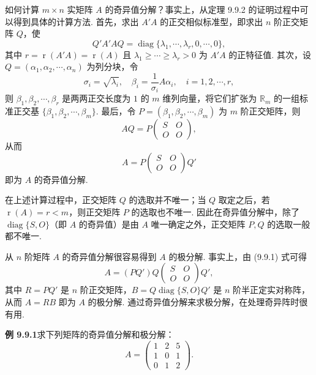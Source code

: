 \documentclass[UTF8, 12pt, fontset=fandol, oneside]{ctexart}
\begin{document}
如何计算 $m\times n$ 实矩阵 $A$ 的奇异值分解？事实上，从定理 9.9.2 的证明过程中可以得到具体的计算方法. 首先，求出 $A'A$ 的正交相似标准型，即求出 $n$ 阶正交矩阵 $Q$，使
\[
  Q'A'AQ=\operatorname{diag}\{\lambda_1,\cdots,\lambda_r,0,\cdots,0\},
\]
其中 $r=\operatorname{r}(A'A)=\operatorname{r}(A)$ 且 $\lambda_1\ge\cdots\ge\lambda_r>0$ 为 $A'A$ 的正特征值. 其次，设 $Q=(\alpha_1,\alpha_2,\cdots,\alpha_n)$ 为列分块，令
\[
  \sigma_i=\sqrt{\lambda_i},\quad \beta_i=\frac1{\sigma_i}A\alpha_i,\quad i=1,2,\cdots,r,
\]
则 $\beta_1,\beta_2,\cdots,\beta_r$ 是两两正交长度为 $1$ 的 $m$ 维列向量，将它们扩张为 $\mathbb R_m$ 的一组标准正交基 $\{\beta_1,\beta_2,\cdots,\beta_m\}$. 最后，令 $P=(\beta_1,\beta_2,\cdots,\beta_m)$ 为 $m$ 阶正交矩阵，则
\[
  AQ=P
  \left(\begin{array}{cc}
    S & O\\
    O & O
  \end{array}\right),
\]
从而
\begin{equation}
  A=P
  \left(\begin{array}{cc}
    S & O\\
    O & O
  \end{array}\right)Q'
  \tag{9.9.1}
\end{equation}
即为 $A$ 的奇异值分解.

在上述计算过程中，正交矩阵 $Q$ 的选取并不唯一；当 $Q$ 取定之后，若 $\operatorname{r}(A)=r<m$，则正交矩阵 $P$ 的选取也不唯一. 因此在奇异值分解中，除了 $\operatorname{diag}\{S,O\}$（即 $A$ 的奇异值）是由 $A$ 唯一确定之外，正交矩阵 $P,Q$ 的选取一般都不唯一.

从 $n$ 阶矩阵 $A$ 的奇异值分解很容易得到 $A$ 的极分解. 事实上，由 (9.9.1) 式可得
\begin{equation}
  A=(PQ')Q
  \left(\begin{array}{cc}
    S & O\\
    O & O
  \end{array}\right)Q',
  \tag{9.9.2}
\end{equation}
其中 $R=PQ'$ 是 $n$ 阶正交矩阵，$B=Q\operatorname{diag}\{S,O\}Q'$ 是 $n$ 阶半正定实对称阵，从而 $A=RB$ 即为 $A$ 的极分解. 通过奇异值分解来求极分解，在处理奇异阵时很有用.

\noindent\textbf{例 9.9.1}\quad 求下列矩阵的奇异值分解和极分解：
\[
  A=
  \left(\begin{array}{ccc}
    1 & 2 & 5\\
    1 & 0 & 1\\
    0 & 1 & 2
  \end{array}\right).
\]
\end{document}
